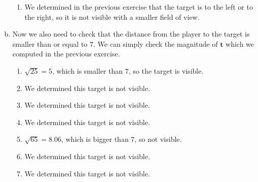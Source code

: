\documentclass[11pt]{article}
\begin{document}
\begin{enumerate}[a.]
\begin{enumerate}[1.)]
	\item %
	We determined in the previous exercise that the target is to the left or to the right, so it is not visible with a smaller field of view.
	
	\end{enumerate}
	
	\item %
	Now we also need to check that the distance from the player to the target is smaller than or equal to $7$. We can simply check the magnitude of $\textbf{t}$ which we computed in the previous exercise.
	\begin{enumerate}
		\item %
			$\sqrt{25}=5$, which is smaller than $7$, so the target is visible.
		\item %
		We determined this target is not visible.
		\item %
		We determined this target is not visible.
		\item %
		We determined this target is not visible.
		\item %
			$\sqrt{65}=8.06$, which is bigger than $7$, so not visible.
		\item %
		We determined this target is not visible.
		\item %
		We determined this target is not visible.
	\end{enumerate}
\end{enumerate}
\end{document}
